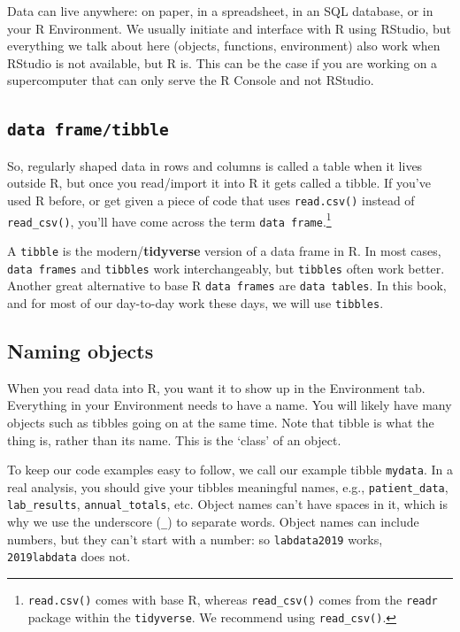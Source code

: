 \documentclass[
  12pt,
  krantz2]{krantz}
\begin{document}
Data can live anywhere: on paper, in a spreadsheet, in an SQL database, or in your R Environment.
We usually initiate and interface with R using RStudio, but everything we talk about here (objects, functions, environment) also work when RStudio is not available, but R is.
This can be the case if you are working on a supercomputer that can only serve the R Console and not RStudio.

\hypertarget{data-frametibble}{%
\subsection{\texorpdfstring{\texttt{data\ frame/tibble}}{data frame/tibble}}\label{data-frametibble}}

So, regularly shaped data in rows and columns is called a table when it lives outside R, but once you read/import it into R it gets called a tibble.
If you've used R before, or get given a piece of code that uses \texttt{read.csv()} instead of \texttt{read\_csv()}, you'll have come across the term \texttt{data\ frame}.\footnote{\texttt{read.csv()} comes with base R, whereas \texttt{read\_csv()} comes from the \texttt{readr} package within the \texttt{tidyverse}. We recommend using \texttt{read\_csv()}.}

A \texttt{tibble} is the modern/\textbf{tidyverse} version of a data frame in R.
In most cases, \texttt{data\ frames} and \texttt{tibbles} work interchangeably, but \texttt{tibbles} often work better.
Another great alternative to base R \texttt{data\ frames} are \texttt{data\ tables}.
In this book, and for most of our day-to-day work these days, we will use \texttt{tibbles}.

\hypertarget{naming-objects}{%
\subsection{Naming objects}\label{naming-objects}}

When you read data into R, you want it to show up in the Environment tab.
Everything in your Environment needs to have a name.
You will likely have many objects such as tibbles going on at the same time.
Note that tibble is what the thing is, rather than its name.
This is the `class' of an object.

To keep our code examples easy to follow, we call our example tibble \texttt{mydata}.
In a real analysis, you should give your tibbles meaningful names, e.g., \texttt{patient\_data}, \texttt{lab\_results}, \texttt{annual\_totals}, etc.
Object names can't have spaces in it, which is why we use the underscore (\texttt{\_}) to separate words.
Object names can include numbers, but they can't start with a number: so \texttt{labdata2019} works, \texttt{2019labdata} does not.
\end{document}
